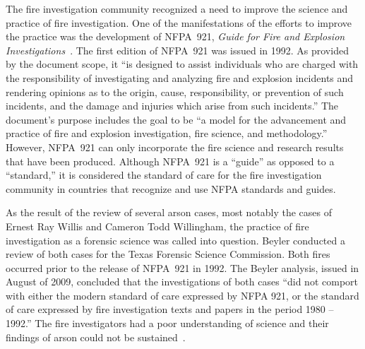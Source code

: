 \documentclass[twoside]{uocthesis}
\begin{document}
The fire investigation community recognized a need to improve the science and practice of fire investigation.  One of the manifestations of the efforts to improve the practice was the development of NFPA~921, {\em Guide for Fire and Explosion Investigations}~\cite{NFPA:921}.  The first edition of NFPA~921 was issued in 1992.  As provided by the document scope, it ``is designed to assist individuals who are charged with the responsibility of investigating and analyzing fire and explosion incidents and rendering opinions as to the origin, cause, responsibility, or prevention of such incidents, and the damage and injuries which arise from such incidents.'' The document’s purpose includes the goal to be ``a model for the advancement and practice of fire and explosion investigation, fire science, and methodology.'' However, NFPA~921 can only incorporate the fire science and research results that have been produced.  Although NFPA~921 is a ``guide'' as opposed to a ``standard,'' it is considered the standard of care for the fire investigation community in countries that recognize and use NFPA standards and guides.

As the result of the review of several arson cases, most notably the cases of Ernest Ray Willis and Cameron Todd Willingham, the practice of fire investigation as a forensic science was called into question.  Beyler conducted a review of both cases for the Texas Forensic Science Commission.  Both fires occurred prior to the release of NFPA~921 in 1992.  The Beyler analysis, issued in August of 2009, concluded that the investigations of both cases ``did not comport with either the modern standard of care expressed by NFPA 921, or the standard of care expressed by fire investigation texts and papers in the period 1980 – 1992.'' The fire investigators had a poor understanding of science and their findings of arson could not be sustained~\cite{Beyler:2009}.
\end{document}
